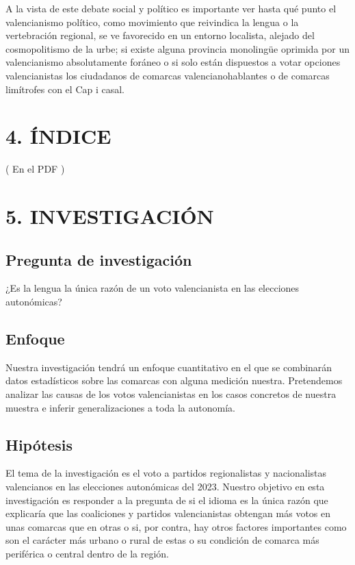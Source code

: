 \documentclass[
]{article}
\begin{document}
A la vista de este debate social y político es importante ver hasta qué
punto el valencianismo político, como movimiento que reivindica la
lengua o la vertebración regional, se ve favorecido en un entorno
localista, alejado del cosmopolitismo de la urbe; si existe alguna
provincia monolingüe oprimida por un valencianismo absolutamente foráneo
o si solo están dispuestos a votar opciones valencianistas los
ciudadanos de comarcas valencianohablantes o de comarcas limítrofes con
el Cap i casal.

\hypertarget{uxedndice}{%
\section{4. ÍNDICE}\label{uxedndice}}

( En el PDF )

\hypertarget{investigaciuxf3n}{%
\section{5. INVESTIGACIÓN}\label{investigaciuxf3n}}

\hypertarget{pregunta-de-investigaciuxf3n}{%
\subsection{Pregunta de
investigación}\label{pregunta-de-investigaciuxf3n}}

¿Es la lengua la única razón de un voto valencianista en las elecciones
autonómicas?

\hypertarget{enfoque}{%
\subsection{Enfoque}\label{enfoque}}

Nuestra investigación tendrá un enfoque cuantitativo en el que se
combinarán datos estadísticos sobre las comarcas con alguna medición
nuestra. Pretendemos analizar las causas de los votos valencianistas en
los casos concretos de nuestra muestra e inferir generalizaciones a toda
la autonomía.

\hypertarget{hipuxf3tesis}{%
\subsection{Hipótesis}\label{hipuxf3tesis}}

El tema de la investigación es el voto a partidos regionalistas y
nacionalistas valencianos en las elecciones autonómicas del 2023.
Nuestro objetivo en esta investigación es responder a la pregunta de si
el idioma es la única razón que explicaría que las coaliciones y
partidos valencianistas obtengan más votos en unas comarcas que en otras
o si, por contra, hay otros factores importantes como son el carácter
más urbano o rural de estas o su condición de comarca más periférica o
central dentro de la región.
\end{document}
